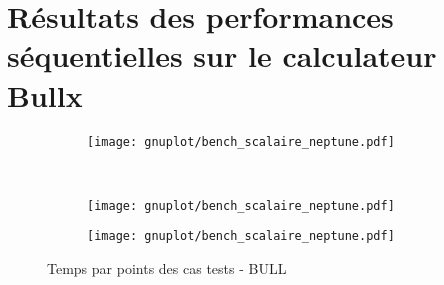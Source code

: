\newpage
\section{Résultats des performances séquentielles sur le calculateur Bullx}\label{app:seq_neptune}
\begin{figure}[!ht]
  \centering
  \begin{subfigure}[b]{0.5\textwidth}
    \centering
    \texttt{[image: gnuplot/bench\_scalaire\_neptune.pdf]}
  \caption{\label{fig:bench_scal_neptune_nonper}}
  \end{subfigure}%
  ~
  \begin{subfigure}[b]{0.5\textwidth}
    \centering
    \texttt{[image: gnuplot/bench\_scalaire\_neptune.pdf]}
  \caption{\label{fig:bench_scal_neptune_sym}}
  \end{subfigure}
  \begin{subfigure}[b]{0.5\textwidth}
    \centering
    \texttt{[image: gnuplot/bench\_scalaire\_neptune.pdf]}
  \caption{\label{fig:bench_scal_neptune_per}}
  \end{subfigure}
  \caption{\label{fig:bench_scal_neptune}Temps par points des cas tests - BULL}
\end{figure}


%



